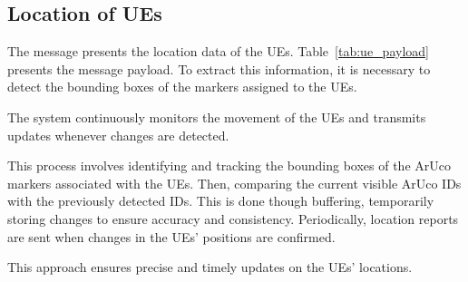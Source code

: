 \begin{table}[H]
    \caption{Components of the payload of PastBlockage Message}
    \label{tab:past_block_payload}
    \centering
\end{table}


\subsection{Location of UEs}\label{subsec:location-of-ues}
The message presents the location data of the UEs. Table~\ref{tab:ue_payload} presents the message payload.
To extract this information, it is necessary to detect the bounding boxes of the markers assigned to the UEs.

The system continuously monitors the movement of the UEs and transmits updates whenever changes are detected.

This process involves identifying and tracking the bounding boxes of the ArUco markers associated with the UEs.
Then, comparing the current visible ArUco IDs with the previously detected IDs. This is done though buffering, temporarily storing changes to ensure accuracy and consistency.
Periodically, location reports are sent when changes in the UEs' positions are confirmed.

This approach ensures precise and timely updates on the UEs' locations.

\begin{table}[H]
    \caption{Components of the UE Location Message payload}
    \label{tab:ue_payload}
    \centering
\end{table}




